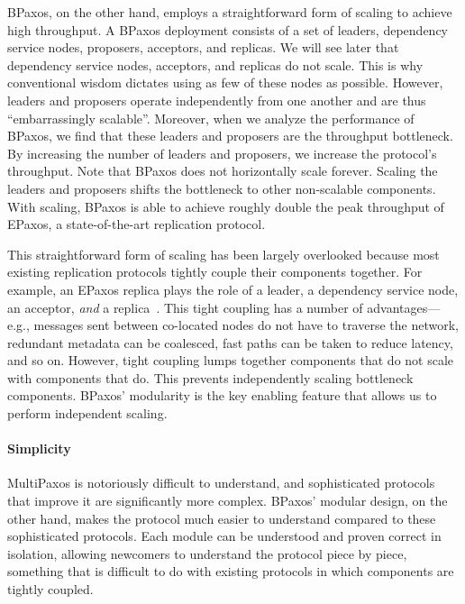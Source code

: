 BPaxos, on the other hand, employs a straightforward form of scaling to achieve
high throughput. A BPaxos deployment consists of a set of leaders, dependency
service nodes, proposers, acceptors, and replicas. We will see later that
dependency service nodes, acceptors, and replicas do not scale. This is why
conventional wisdom dictates using as few of these nodes as possible. However,
leaders and proposers operate independently from one another and are thus
``embarrassingly scalable''. Moreover, when we analyze the performance of
BPaxos, we find that these leaders and proposers are the throughput bottleneck.
By increasing the number of leaders and proposers, we increase the protocol's
throughput. Note that BPaxos does not horizontally scale forever. Scaling the
leaders and proposers shifts the bottleneck to other non-scalable components.
With scaling, BPaxos is able to achieve roughly double the peak throughput of
EPaxos, a state-of-the-art replication protocol.

This straightforward form of scaling has been largely overlooked because most
existing replication protocols tightly couple their components together. For
example, an EPaxos replica plays the role of a leader, a dependency service
node, an acceptor, \emph{and} a replica~\cite{arun2017speeding}. This tight
coupling has a number of advantages---e.g., messages sent between co-located
nodes do not have to traverse the network, redundant metadata can be coalesced,
fast paths can be taken to reduce latency, and so on. However, tight coupling
lumps together components that do not scale with components that do. This
prevents independently scaling bottleneck components. BPaxos' modularity is the
key enabling feature that allows us to perform independent scaling.

\paragraph{Simplicity}
MultiPaxos is notoriously difficult to understand, and sophisticated protocols
that improve it are significantly more complex. BPaxos' modular design, on the
other hand, makes the protocol much easier to understand compared to these
sophisticated protocols. Each module can be understood and proven correct in
isolation, allowing newcomers to understand the protocol piece by piece,
something that is difficult to do with existing protocols in which components
are tightly coupled.

